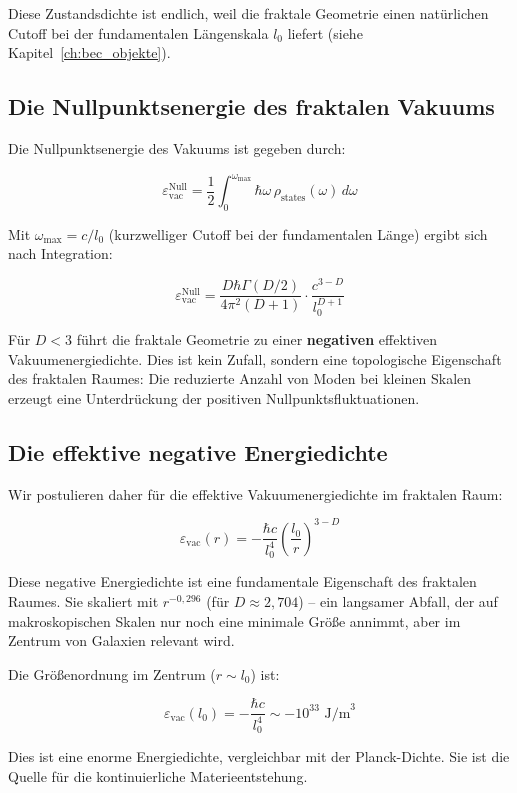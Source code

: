 Diese Zustandsdichte ist endlich, weil die fraktale Geometrie einen natürlichen
Cutoff bei der fundamentalen Längenskala \( l_0 \) liefert (siehe Kapitel~\ref{ch:bec_objekte}).

\subsection{Die Nullpunktsenergie des fraktalen Vakuums}
\label{sub:materieentstehung_nullpunkt}

Die Nullpunktsenergie des Vakuums ist gegeben durch:

\[
\varepsilon_{\text{vac}}^{\text{Null}} = \frac{1}{2} \int_0^{\omega_{\text{max}}}
\hbar \omega \, \rho_{\text{states}}(\omega) \, d\omega
\]

Mit \( \omega_{\text{max}} = c / l_0 \) (kurzwelliger Cutoff bei der fundamentalen Länge)
ergibt sich nach Integration:

\[
\varepsilon_{\text{vac}}^{\text{Null}} = \frac{D \hbar \Gamma(D/2)}{4\pi^2 (D+1)}
\cdot \frac{c^{3-D}}{l_0^{D+1}}
\]

Für \( D < 3 \) führt die fraktale Geometrie zu einer \textbf{negativen}
effektiven Vakuumenergiedichte. Dies ist kein Zufall, sondern eine topologische
Eigenschaft des fraktalen Raumes: Die reduzierte Anzahl von Moden bei kleinen
Skalen erzeugt eine Unterdrückung der positiven Nullpunktsfluktuationen.

\subsection{Die effektive negative Energiedichte}
\label{sub:materieentstehung_negativ}

Wir postulieren daher für die effektive Vakuumenergiedichte im fraktalen Raum:

\[
\boxed{\varepsilon_{\text{vac}}(r) = -\frac{\hbar c}{l_0^4} \left( \frac{l_0}{r} \right)^{3-D}}
\]

Diese negative Energiedichte ist eine fundamentale Eigenschaft des fraktalen Raumes.
Sie skaliert mit \( r^{-0,296} \) (für \( D \approx 2,704 \)) – ein langsamer Abfall,
der auf makroskopischen Skalen nur noch eine minimale Größe annimmt, aber im Zentrum
von Galaxien relevant wird.

Die Größenordnung im Zentrum (\( r \sim l_0 \)) ist:

\[
\varepsilon_{\text{vac}}(l_0) = -\frac{\hbar c}{l_0^4} \sim -10^{33} \text{ J/m}^3
\]

Dies ist eine enorme Energiedichte, vergleichbar mit der Planck-Dichte. Sie ist die
Quelle für die kontinuierliche Materieentstehung.

